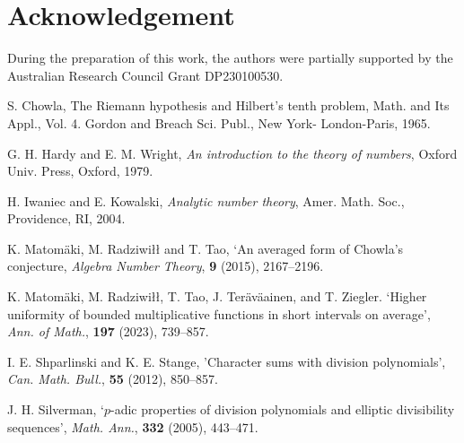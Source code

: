 \documentclass[12pt]{amsart}
\begin{document}
 
 




\section*{Acknowledgement}

During the preparation of this work, the  authors   were partially supported by the
Australian Research Council Grant DP230100530.   

\begin{thebibliography}{9}



 S. Chowla, {The Riemann hypothesis and Hilbert's tenth problem\/},  
 Math.  and Its Appl., Vol. 4. Gordon and Breach Sci. Publ., New York- London-Paris, 1965.


  

 G. H. Hardy and E. M. Wright, {\it An introduction to
the theory of numbers\/}, Oxford Univ. Press, Oxford, 1979.

H. Iwaniec and E. Kowalski, {\it Analytic number theory\/}, Amer. Math. Soc., Providence, RI, 2004.


  K. Matom{\"a}ki, M. Radziwi{\l}{\l} and T. Tao, 
`An averaged form of Chowla's conjecture,
 {\it Algebra Number Theory\/},  {\bf 9} (2015), 2167--2196.
 
 K. Matom{\"a}ki, M. Radziwi{\l}{\l}, T. Tao, J. Ter{\"a}v{\"a}ainen, and T. Ziegler. 
`Higher uniformity of bounded multiplicative functions in short intervals on average',
{\it Ann. of Math.\/}, {\bf 197} (2023), 739--857.

I. E. Shparlinski and K. E. Stange,
 'Character sums with division polynomials', {\it Can. Math. Bull.\/}, {\bf 55} (2012), 850--857.

 J. H. Silverman,
`$p$-adic properties of division polynomials and elliptic divisibility sequences', 
{\it Math. Ann.\/}, {\bf 332} (2005),  443--471.


\end{thebibliography}
\end{document}
